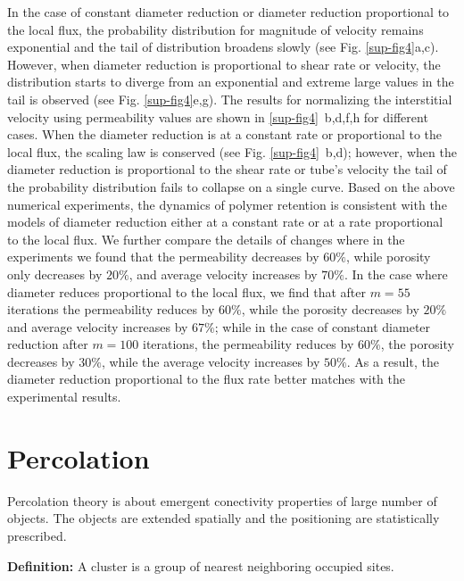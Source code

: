 In the case of constant diameter reduction  or diameter reduction proportional to the local flux, the probability distribution for magnitude of velocity remains exponential and the tail of distribution broadens slowly (see Fig. \ref{sup-fig4}a,c). However, when diameter reduction is  proportional to shear rate or velocity, the distribution starts to diverge from an exponential and extreme large values in the tail is observed (see Fig. \ref{sup-fig4}e,g). The results for normalizing the interstitial velocity using permeability values are shown in \ref{sup-fig4}~b,d,f,h for different cases. When the diameter reduction is at a constant rate or proportional to the local flux, the scaling law is conserved (see Fig. \ref{sup-fig4}~b,d); however, when the diameter reduction is proportional to the shear rate or tube's velocity the tail of the probability distribution fails to collapse on a single curve. Based on the above numerical experiments, the dynamics of polymer retention is consistent with the models of diameter reduction either at a constant rate or at a rate proportional to the local flux. We further compare the details of changes where in the experiments we found that the permeability decreases by $60\%$, while porosity only decreases by $20\%$, and average velocity increases by $70\%$. In the case where diameter reduces proportional to the local flux, we find that after $m=55$ iterations the permeability reduces by $60\%$, while the porosity decreases by $20\%$ and average velocity increases by $67\%$; while in the case of constant diameter reduction  after $m=100$ iterations, the permeability reduces by $60\%$, the porosity decreases by $30\%$, while the average velocity increases by $50\%$. As a result, the diameter reduction proportional to the flux rate better matches with the experimental results. 





\newpage

\section{Percolation}

Percolation theory is about emergent conectivity properties of large
number of objects. The objects are extended spatially and the
positioning are statistically prescribed.






\textbf{Definition:} A cluster is a group of nearest neighboring occupied
sites.

